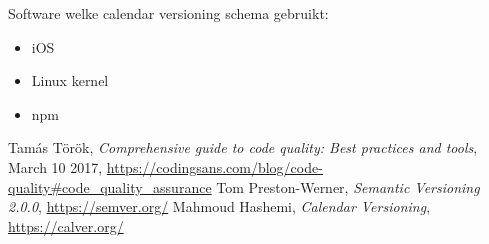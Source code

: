 \documentclass[12pt]{article}
\begin{document}
Software welke calendar versioning schema gebruikt:
\begin{itemize}
	\item iOS
	\item Linux kernel
	\item npm
\end{itemize}

\begin{thebibliography}{9}
		Tamás Török,
		\textit{Comprehensive guide to code quality: Best practices and tools},
		March 10 2017,
		\url{https://codingsans.com/blog/code-quality#code_quality_assurance}
		Tom Preston-Werner,
		\textit{Semantic Versioning 2.0.0},
		\url{https://semver.org/}
		Mahmoud Hashemi,
		\textit{Calendar Versioning},
		\url{https://calver.org/}
\end{thebibliography}
\end{document}
